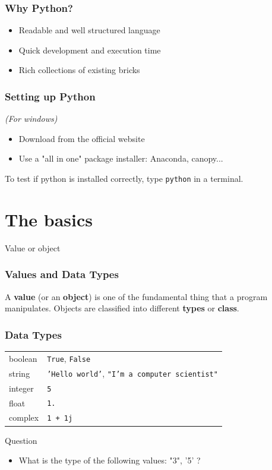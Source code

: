 \documentclass[xcolor=dvipsnames]{beamer}
\begin{document}
\begin{frame}
\frametitle{Why Python?}
\begin{itemize}
\item Readable and well structured language
\item Quick development and execution time
\item Rich collections of existing bricks
\end{itemize}
\end{frame}

\begin{frame}
\frametitle{Setting up Python}
\textit{(For windows)}
\begin{itemize}
\item Download from the official website
\item Use a "all in one" package installer: Anaconda, canopy...
\end{itemize}

\vspace{2em}
To test if python is installed correctly, type \texttt{python} in a terminal.
\end{frame}

\section{The basics}

\begin{frame}
\begin{block}{Value or object}
\frametitle{Values and Data Types}
A \textbf{value} (or an \textbf{object}) is one of the fundamental thing that
a program manipulates. Objects are classified into different \textbf{types} or
\textbf{class}.
\end{block}

\vspace{1em}

\end{frame}

\begin{frame}
\frametitle{Data Types}

\begin{tabular}{l | l}
boolean & \texttt{True}, \texttt{False} \\
string & \texttt{'Hello world'}, \texttt{"I'm a computer scientist"} \\
integer & \texttt{5} \\
float & \texttt{1.} \\ 
complex & \texttt{1 + 1j}
\end{tabular}

\vspace{1em}
\begin{alertblock}{Question}
\begin{itemize}
\item What is the type of the following values: "3", '5' ?
\end{itemize}
\end{alertblock}
\end{frame}
\end{document}
